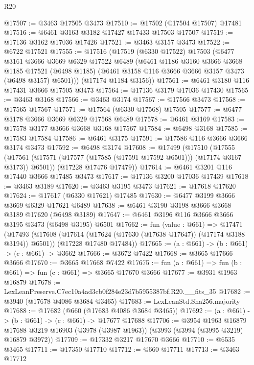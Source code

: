 \begin{lexlean}{R20}
\begin{coremodule}
@17507 := @3463 @17505 @3473
@17510 := @17502 (@17504 @17507) @17481
@17516 := @6461 @3163 @3182 @17427 @17433 @17503 @17507
@17519 := @17136 @3162 @17036 @17426
@17521 := @3463 @3157 @3473
@17522 := @6722 @17521
@17555 := @17516
    (@17519
      (@6330 @17522)
      @17503
      (@6477
        @3161
        @3666
        @3669
        @6329
        @17522
        @6489
        (@6461
          @1186
          @3160
          @3666
          @3668
          @1185
          @17521
          (@6498 @1185)
          (@6461 @3158 @116 @3666 @3666 @3157 @3473 (@6498 @3157) @6501)))
      (@17174 @1184 @3156))
@17561 := @6461 @3180 @116 @17431 @3666 @17505 @3473
@17564 := @17136 @3179 @17036 @17430
@17565 := @3463 @3168
@17566 := @3463 @3174
@17567 := @17566 @3473
@17568 := @17565 @17567
@17571 := @17564 (@6330 @17568) @17505
@17577 := @6477 @3178 @3666 @3669 @6329 @17568 @6489
@17578 := @6461 @3169
@17583 := @17578 @3177 @3666 @3668 @3168 @17567
@17584 := @6498 @3168
@17585 := @17583 @17584
@17586 := @6461 @3175
@17591 := @17586 @116 @3666 @3666 @3174 @3473
@17592 := @6498 @3174
@17608 := @17499
    (@17510
      (@17555 (@17561 (@17571 (@17577 (@17585 (@17591 @17592 @6501))) (@17174 @3167 @3173)) @6501))
      (@17228 @17476 @17479))
@17614 := @6461 @3201 @116 @17440 @3666 @17485 @3473
@17617 := @17136 @3200 @17036 @17439
@17618 := @3463 @3189
@17620 := @3463 @3195 @3473
@17621 := @17618 @17620
@17624 := @17617 (@6330 @17621) @17485
@17630 := @6477 @3199 @3666 @3669 @6329 @17621 @6489
@17638 := @6461 @3190 @3198 @3666 @3668 @3189 @17620 (@6498 @3189)
@17647 := @6461 @3196 @116 @3666 @3666 @3195 @3473 (@6498 @3195) @6501
@17662 := fun (value : @661) =>
  @17471
    (@17493
      (@17608 (@17614 (@17624 (@17630 (@17638 @17647)) (@17174 @3188 @3194)) @6501))
      (@17228 @17480 @17484))
@17665 := (a : @661) -> (b : @661) -> (c : @661) -> @3662
@17666 := @3672 @7422
@17668 := @3665 @17666 @3666
@17670 := @3665 @17668 @7422
@17675 := fun (a : @661) => fun (b : @661) => fun (c : @661) => @3665 @17670 @3666
@17677 := @3931 @1963 @16879
@17678 := LexLeanPreserve.C7ec10a4ad3cb0f284e23d7b5955387bf.R20.__fits_35
@17682 := @3940 (@17678 @4086 @3684 @3465)
@17683 := LexLeanStd.Sha256.majority
@17688 := @17682 (@660 (@17683 @4086 @3684 @3465))
@17692 := (a : @661) -> (b : @661) -> (c : @661) -> @17677 @17688
@17706 := @3954
    @1963
    @16879
    @17688
    @3219
    @16903
    (@3978 (@3987 @1963))
    (@3993 (@3994 (@3995 @3219) @16879 @3972))
@17709 := @17332 @3217 @17670 @3666
@17710 := @6535 @3465
@17711 := @17350 @17710
@17712 := @660 @17711
@17713 := @3463 @17712

\end{coremodule}
\end{lexlean}
